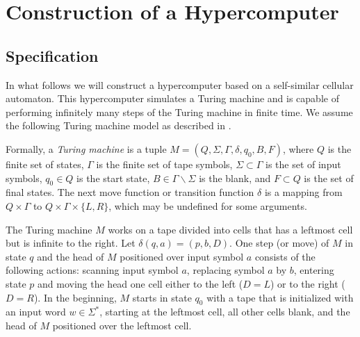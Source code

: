 \documentclass{article}
\theoremstyle{definition}
\begin{document}
\section{Construction of a Hypercomputer}
\label{sec:hypercomputer}

\subsection{Specification}
\label{sec:hc-spec}

In what follows we will construct a hypercomputer based on a self-similar cellular automaton.
This hypercomputer simulates a Turing machine and is capable of performing infinitely many steps
of the Turing machine in finite time.
We assume the following Turing machine model as described in \cite{hopcroft}.

Formally, a {\em Turing machine}  is a tuple
$M = (Q, \Sigma, \Gamma, \delta, q_0, B, F)$,
where $Q$ is the finite set of states, $\Gamma$ is the finite set of tape symbols,
$\Sigma \subset \Gamma$ is the set of input symbols, $q_0 \in Q$ is the start state,
$B \in \Gamma \backslash \Sigma$ is the blank, and $F \subset Q$ is the set of final states.
The next move function or transition function $\delta$ is a mapping from
$Q \times \Gamma$ to $Q \times \Gamma \times \{L, R\}$, which may be undefined for some arguments.

The Turing machine $M$ works on a tape divided into cells that has a leftmost cell but is infinite to the right.
Let $\delta(q, a) = (p, b, D)$.
One step (or move) of $M$ in state $q$ and the head of $M$ positioned over input symbol $a$
consists of the following actions:
scanning input symbol $a$, replacing symbol $a$ by $b$,
entering state $p$ and moving the head one cell either to the left ($D=L$) or to the right ($D=R$).
In the beginning, $M$ starts in state $q_0$ with a tape that is initialized with an input word $w \in \Sigma^*$,
starting at the leftmost cell, all other cells blank,
and the head of $M$ positioned over the leftmost cell.
\end{document}
